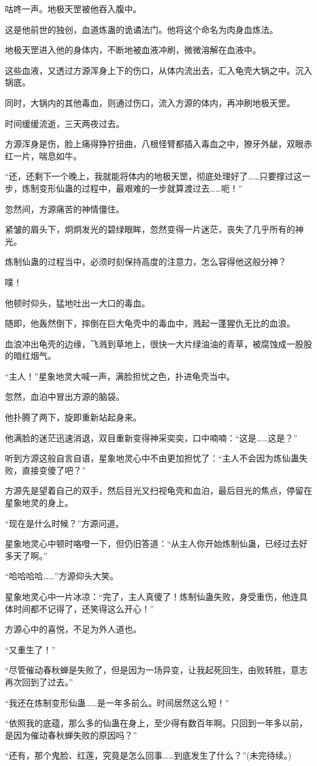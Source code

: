 \begin{this_body}
咕咚一声。地极天罡被他吞入腹中。

这是他前世的独创，血道炼蛊的诡谲法门。他将这个命名为肉身血炼法。

地极天罡进入他的身体内，不断地被血液冲刷，微微溶解在血液中。

这些血液，又透过方源浑身上下的伤口，从体内流出去，汇入龟壳大锅之中。沉入锅底。

同时，大锅内的其他毒血，则通过伤口，流入方源的体内，再冲刷地极天罡。

时间缓缓流逝，三天两夜过去。

方源浑身是伤，脸上痛得狰狞扭曲，八根怪臂都插入毒血之中，獠牙外龇，双眼赤红一片，喘息如牛。

“还，还剩下一个晚上，我就能将体内的地极天罡，彻底处理好了……只要撑过这一步，炼制变形仙蛊的过程中，最艰难的一步就算渡过去……呃！”

忽然间，方源痛苦的神情僵住。

紧皱的眉头下，炯炯发光的碧绿眼眸，忽然变得一片迷茫，丧失了几乎所有的神光。

炼制仙蛊的过程当中，必须时刻保持高度的注意力，怎么容得他这般分神？

噗！

他顿时仰头，猛地吐出一大口的毒血。

随即，他轰然倒下，摔倒在巨大龟壳中的毒血中，溅起一蓬猩仇无比的血浪。

血浪冲出龟壳的边缘，飞溅到草地上，很快一大片绿油油的青草，被腐蚀成一股股的暗红烟气。

“主人！”星象地灵大喊一声，满脸担忧之色，扑进龟壳当中。

忽然，血泊中冒出方源的脑袋。

他扑腾了两下，旋即重新站起身来。

他满脸的迷茫迅速消退，双目重新变得神采奕奕，口中喃喃：“这是……这是？”

听到方源这般自言自语，星象地灵心中不由更加担忧了：“主人不会因为炼仙蛊失败，直接变傻了吧？”

方源先是望着自己的双手，然后目光又扫视龟壳和血泊，最后目光的焦点，停留在星象地灵的身上。

“现在是什么时候？”方源问道。

星象地灵心中顿时咯噔一下，但仍旧答道：“从主人你开始炼制仙蛊，已经过去好多天了啊。”

“哈哈哈哈……”方源仰头大笑。

星象地灵心中一片冰凉：“完了，主人真傻了！炼制仙蛊失败，身受重伤，他连具体时间都不记得了，还笑得这么开心！”

方源心中的喜悦，不足为外人道也。

“又重生了！”

“尽管催动春秋蝉是失败了，但是因为一场异变，让我起死回生，由败转胜，意志再次回到了过去。”

“我还在炼制变形仙蛊……是一年多前么。时间居然这么短！”

“依照我的底蕴，那么多的仙蛊在身上，至少得有数百年啊。只回到一年多以前，是因为催动春秋蝉失败的原因吗？”

“还有，那个鬼脸、红莲，究竟是怎么回事……到底发生了什么？”(未完待续。)

\end{this_body}

